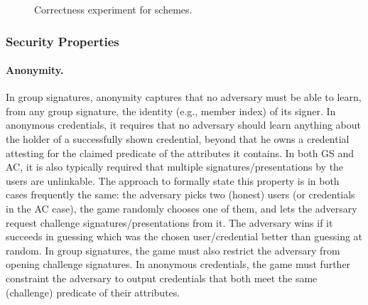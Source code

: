 \begin{figure}[htp!]
  
  \caption{Correctness experiment for \UAS schemes.}
  \label{fig:exp-uas-corr}
\end{figure}

\subsubsection{Security Properties}
\label{sssec:security}

\paragraph{Anonymity.} %
In group signatures, anonymity captures that no adversary must be able to learn,
from any group signature, the identity (e.g., member index) of its signer. In 
anonymous credentials, it requires that no adversary should learn anything about
the holder of a successfully shown credential, beyond that he owns a credential
attesting for the claimed predicate of the attributes it contains. In both GS
and AC, it is also typically required that
multiple signatures/presentations by the users are unlinkable. The approach to
formally state this property is in both cases frequently the same: the adversary
picks two (honest) users (or credentials in the AC case), the game randomly
chooses one of them, and lets the adversary request challenge
signatures/presentations from it. The adversary wins if it succeeds in guessing
which was the chosen user/credential better than guessing at random. In group
signatures, the game must also restrict the adversary from opening challenge
signatures. In anonymous credentials, the game must further constraint the
adversary to output credentials that both meet the same (challenge) predicate
of their attributes.

